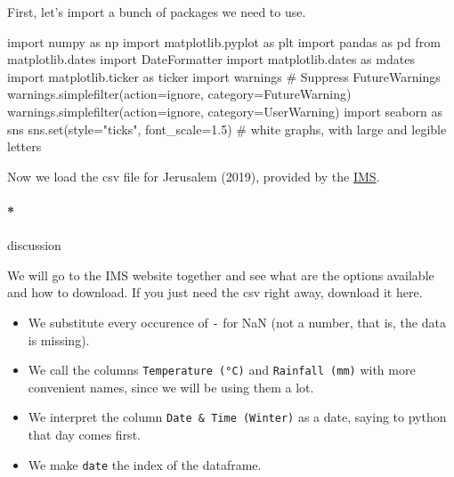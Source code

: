 \documentclass[
  letterpaper,
  DIV=11,
  numbers=noendperiod,
  oneside]{scrreprt}
\let\oldparagraph\paragraph
\renewcommand{\paragraph}[1]{\oldparagraph{#1}\mbox{}}
\newenvironment{Shaded}{\begin{snugshade}}{\end{snugshade}}
\newcommand{\BuiltInTok}[1]{\textcolor[rgb]{0.00,0.23,0.31}{#1}}
\newcommand{\CommentTok}[1]{\textcolor[rgb]{0.37,0.37,0.37}{#1}}
\newcommand{\FloatTok}[1]{\textcolor[rgb]{0.68,0.00,0.00}{#1}}
\newcommand{\ImportTok}[1]{\textcolor[rgb]{0.00,0.46,0.62}{#1}}
\newcommand{\NormalTok}[1]{\textcolor[rgb]{0.00,0.23,0.31}{#1}}
\newcommand{\OperatorTok}[1]{\textcolor[rgb]{0.37,0.37,0.37}{#1}}
\newcommand{\PreprocessorTok}[1]{\textcolor[rgb]{0.68,0.00,0.00}{#1}}
\newcommand{\StringTok}[1]{\textcolor[rgb]{0.13,0.47,0.30}{#1}}
\providecommand{\tightlist}{%
  \setlength{\itemsep}{0pt}\setlength{\parskip}{0pt}}\usepackage{longtable,booktabs,array}
\begin{document}
First, let's import a bunch of packages we need to use.

\begin{Shaded}
\begin{Highlighting}[]
\ImportTok{import}\NormalTok{ numpy }\ImportTok{as}\NormalTok{ np}
\ImportTok{import}\NormalTok{ matplotlib.pyplot }\ImportTok{as}\NormalTok{ plt}
\ImportTok{import}\NormalTok{ pandas }\ImportTok{as}\NormalTok{ pd}
\ImportTok{from}\NormalTok{ matplotlib.dates }\ImportTok{import}\NormalTok{ DateFormatter}
\ImportTok{import}\NormalTok{ matplotlib.dates }\ImportTok{as}\NormalTok{ mdates}
\ImportTok{import}\NormalTok{ matplotlib.ticker }\ImportTok{as}\NormalTok{ ticker}
\ImportTok{import}\NormalTok{ warnings}
\CommentTok{\# Suppress FutureWarnings}
\NormalTok{warnings.simplefilter(action}\OperatorTok{=}\StringTok{\textquotesingle{}ignore\textquotesingle{}}\NormalTok{, category}\OperatorTok{=}\PreprocessorTok{FutureWarning}\NormalTok{)}
\NormalTok{warnings.simplefilter(action}\OperatorTok{=}\StringTok{\textquotesingle{}ignore\textquotesingle{}}\NormalTok{, category}\OperatorTok{=}\PreprocessorTok{UserWarning}\NormalTok{)}
\ImportTok{import}\NormalTok{ seaborn }\ImportTok{as}\NormalTok{ sns}
\NormalTok{sns.}\BuiltInTok{set}\NormalTok{(style}\OperatorTok{=}\StringTok{"ticks"}\NormalTok{, font\_scale}\OperatorTok{=}\FloatTok{1.5}\NormalTok{)  }\CommentTok{\# white graphs, with large and legible letters}
\end{Highlighting}
\end{Shaded}

Now we load the csv file for Jerusalem (2019), provided by the
\href{https://ims.gov.il/en/data_gov}{IMS}.

\hypertarget{discussion}{%
\paragraph*{discussion}\label{discussion}}

We will go to the IMS website together and see what are the options
available and how to download. If you just need the csv right away,
download it here.

\begin{itemize}
\tightlist
\item
  We substitute every occurence of \texttt{-} for NaN (not a number,
  that is, the data is missing).
\item
  We call the columns \texttt{Temperature\ (°C)} and
  \texttt{Rainfall\ (mm)} with more convenient names, since we will be
  using them a lot.
\item
  We interpret the column \texttt{Date\ \&\ Time\ (Winter)} as a date,
  saying to python that day comes first.
\item
  We make \texttt{date} the index of the dataframe.
\end{itemize}
\end{document}
